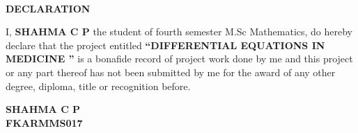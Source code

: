 


\thispagestyle{empty}
~~\vspace{0.5cm}
\begin{center} \large \textbf{DECLARATION}\\
\vspace{2cm}
 \end{center} \normalsize
I,   \textbf{SHAHMA C P}  the    student of fourth semester M.Sc Mathematics,  do hereby declare that the project  entitled \textbf{``DIFFERENTIAL EQUATIONS IN MEDICINE ''} is a bonafide record of  project work  done by me and this project  or any part thereof  has not been submitted by me  for
 the award of any other degree, diploma, title or  recognition before.\\[1cm]


\begin{flushright}
\textbf{SHAHMA C P}\\
\textbf{FKARMMS017}\\
\end{flushright}